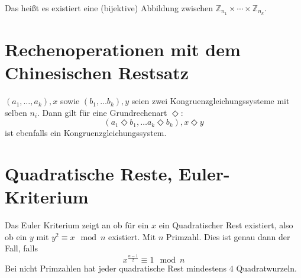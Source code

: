 Das heißt es existiert eine (bijektive) Abbildung zwischen $\mathbb{Z}_{n_1} \times \cdots \times \mathbb{Z}_{n_k}$.

\section{Rechenoperationen mit dem Chinesischen Restsatz}
$(a_1, \ldots, a_k), x$ sowie $(b_1, \ldots b_k), y$ seien zwei Kongruenzgleichungssysteme
mit selben $n_i$.
Dann gilt für eine Grundrechenart $\Diamond$:
\begin{equation}
    (a_1 \Diamond b_1, \ldots a_k \Diamond b_k), x \Diamond y
\end{equation}
ist ebenfalls ein Kongruenzgleichungssystem.

\section{Quadratische Reste, Euler-Kriterium}
Das Euler Kriterium zeigt an ob für ein $x$ ein Quadratischer Rest existiert, also ob ein
$y$ mit $y^2 \equiv x \mod n$ existiert. Mit $n$ Primzahl.
Dies ist genau dann der Fall, falls
\begin{equation}
    x^{\frac{n-1}{2}} \equiv 1 \mod n
\end{equation}
Bei nicht Primzahlen hat jeder quadratische Rest mindestens $4$ Quadratwurzeln.

